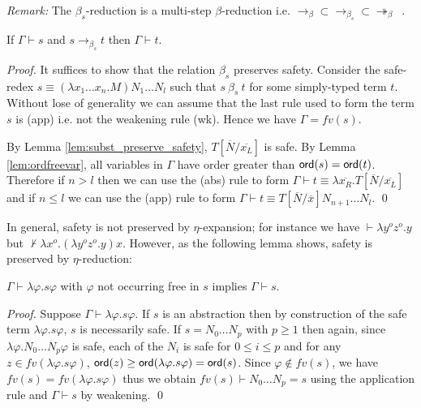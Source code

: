 \documentclass{llncs}
\newcommand\betared{\rightarrow_\beta}
\newcommand\betasred{\rightarrow_{\beta_s}}
\newcommand\betaredtr{\twoheadrightarrow_\beta} %
\newcommand\subst[2]{\left[ #1/#2 \right]}
\begin{document}
\noindent \emph{Remark:} The $\beta_s$-reduction is a multi-step
$\beta$-reduction i.e. $\betared \subset \betasred \subset
\betaredtr$\ .


\begin{lemma}
\label{lem:safered_preserve_safety}
If $\Gamma \vdash s$ and $s \betasred t$ then $\Gamma \vdash t$.
\end{lemma}

\begin{proof}
  It suffices to show that the relation $\beta_s$ preserves safety.
  Consider the safe-redex $ s \equiv (\lambda x_1 \ldots x_n . M) N_1
  \ldots N_l $ such that $s\ \beta_s\ t$ for some simply-typed term
  $t$.  Without lose of generality we can assume that the last rule
  used to form the term $s$ is {\sf(app)} i.e. not the weakening rule
  {\sf(wk)}. Hence we have $\Gamma = fv(s)$.

  By Lemma \ref{lem:subst_preserve_safety},
  $T\subst{\overline{N}}{\overline{x_L}}$ is safe.  By Lemma
  \ref{lem:ordfreevar}, all variables in $\Gamma$ have order greater
  than ${\sf ord}(s) = {\sf ord}(t)$. Therefore if $n>l$ then we can use the
  {\sf(abs)} rule to form $\Gamma \vdash t \equiv \lambda
  \overline{x_R}. T\subst{\overline{N}}{\overline{x_L}}$ and if $n
  \leq l$ we can use the {\sf(app)} rule to form $\Gamma \vdash t
  \equiv T\subst{\overline{N}}{\overline{x}} N_{n+1} \ldots N_l$.
  \qed
\end{proof}

In general, safety is not preserved by $\eta$-expansion; for instance
we have
$\vdash \lambda y^o z^o . y$ but 
$\not \vdash \lambda x^o . (\lambda y^o z^o . y) x$.
However, as the following lemma shows, safety is preserved by $\eta$-reduction:

\begin{lemma}
  $\Gamma \vdash \lambda \varphi . s \varphi $ with $\varphi$ not
  occurring free in $s$ implies $\Gamma \vdash s$.
\end{lemma}
\begin{proof}
  Suppose $\Gamma \vdash \lambda \varphi . s \varphi $. If $s$ is an
  abstraction then by construction of the safe term $\lambda \varphi
  . s \varphi$, $s$ is necessarily safe.  If $s = N_0 \ldots N_p$ with
  $p\geq 1$ then again, since $\lambda \varphi . N_0 \ldots N_p
  \varphi$ is safe, each of the $N_i$ is safe for $0 \leq i \leq p$
  and for any $z\in fv(\lambda \varphi . s \varphi)$, ${\sf ord}(z) \geq
  {\sf ord}(\lambda \varphi . s \varphi) = {\sf ord}(s)$. Since $\varphi \not\in
  fv(s)$, we have $fv(s) = fv(\lambda \varphi . s \varphi)$ thus we
  obtain $fv(s) \vdash N_0 \ldots N_p = s$ using the application rule
  and $\Gamma \vdash s$ by weakening. \qed
\end{proof}
\end{document}
